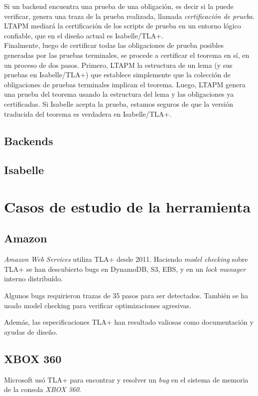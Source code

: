 \documentclass[spanish]{llncs}
\begin{document}
  Si un backend encuentra una prueba de una obligación, es decir si la puede verificar,
  genera una traza de la prueba realizada, llamada \textit{certificación de prueba}. LTAPM  mediará
  la certificación de los scripts de prueba en un entorno lógico confiable, que en el diseño actual
  es Isabelle/TLA+.
  \\
  
  Finalmente, luego de certificar todas las obligaciones de prueba posibles generadas por las pruebas
  terminales, se procede a certificar el teorema en sí, en un proceso de dos pasos. Primero, LTAPM  la
  estructura de un lema (y sus pruebas en Isabelle/TLA+) que establece simplemente que la colección de
  obligaciones de pruebas terminales implican el teorema. Luego, LTAPM genera una prueba del teorema
  usando la estructura del lema y las obligaciones ya certificadas. Si Isabelle acepta la prueba, estamos
  seguros de que la versión traducida del teorema es verdadera en Isabelle/TLA+.

  \subsection{Backends}
    \subsection{Isabelle}
    
\section{Casos de estudio de la herramienta}


\subsection{Amazon}
\textit{Amazon Web Services} utiliza TLA+ desde 2011. Haciendo \textit{model checking} sobre TLA+ se han descubierto bugs
en DynamoDB, S3, EBS, y en un \textit{lock manager} interno distribuído.

Algunos bugs requirieron trazas de 35 pasos para ser detectados. También se ha usado model checking para verificar optimizaciones agresivas.

Además, las especificaciones TLA+ han resultado valiosas como documentación y ayudas de diseño.
\cite{amazon}

\subsection{XBOX 360}
Microsoft usó TLA+ para encontrar y resolver un \textit{bug} en el sistema de memoria de la consola \textit{XBOX 360}.
\cite{xbox360}
\end{document}
